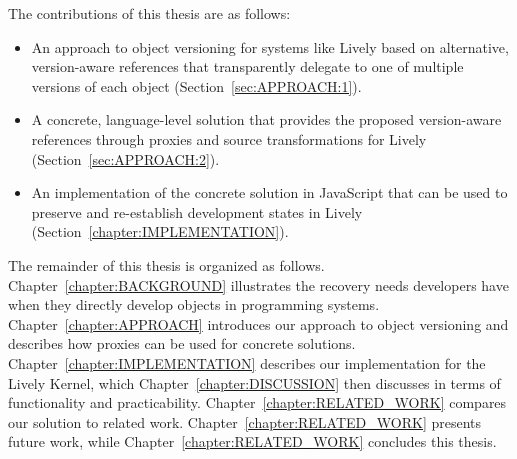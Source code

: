 The contributions of this thesis are as follows:
\begin{itemize}
    \item An approach to object versioning for systems like Lively based on alternative, version-aware references that transparently delegate to one of multiple versions of each object (Section~\ref{sec:APPROACH:1}).
    \item A concrete, language-level solution that provides the proposed version-aware references through proxies and source transformations for Lively (Section~\ref{sec:APPROACH:2}).
    \item An implementation of the concrete solution in JavaScript that can be used to preserve and re-establish development states in Lively (Section~\ref{chapter:IMPLEMENTATION}).\\
\end{itemize}

The remainder of this thesis is organized as follows. 
Chapter~\ref{chapter:BACKGROUND} illustrates the recovery needs developers have when they directly develop objects in programming systems.
Chapter~\ref{chapter:APPROACH} introduces our approach to object versioning and describes how proxies can be used for concrete solutions.
Chapter~\ref{chapter:IMPLEMENTATION} describes our implementation for the Lively Kernel, which Chapter~\ref{chapter:DISCUSSION} then discusses in terms of functionality and practicability.
Chapter~\ref{chapter:RELATED_WORK} compares our solution to related work.
Chapter~\ref{chapter:RELATED_WORK} presents future work, while Chapter~\ref{chapter:RELATED_WORK} concludes this thesis.
